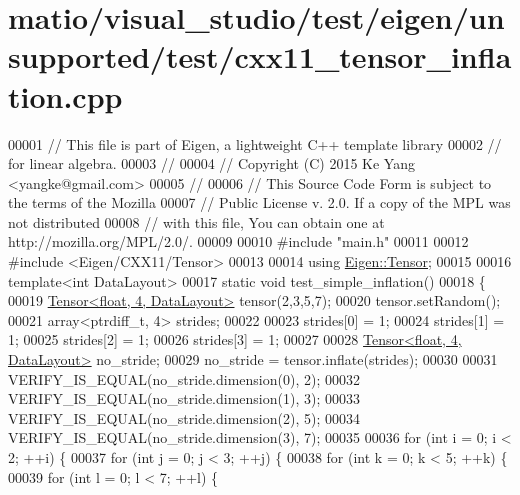 \hypertarget{matio_2visual__studio_2test_2eigen_2unsupported_2test_2cxx11__tensor__inflation_8cpp_source}{}\section{matio/visual\+\_\+studio/test/eigen/unsupported/test/cxx11\+\_\+tensor\+\_\+inflation.cpp}
\label{matio_2visual__studio_2test_2eigen_2unsupported_2test_2cxx11__tensor__inflation_8cpp_source}

\begin{DoxyCode}
00001 \textcolor{comment}{// This file is part of Eigen, a lightweight C++ template library}
00002 \textcolor{comment}{// for linear algebra.}
00003 \textcolor{comment}{//}
00004 \textcolor{comment}{// Copyright (C) 2015 Ke Yang <yangke@gmail.com>}
00005 \textcolor{comment}{//}
00006 \textcolor{comment}{// This Source Code Form is subject to the terms of the Mozilla}
00007 \textcolor{comment}{// Public License v. 2.0. If a copy of the MPL was not distributed}
00008 \textcolor{comment}{// with this file, You can obtain one at http://mozilla.org/MPL/2.0/.}
00009 
00010 \textcolor{preprocessor}{#include "main.h"}
00011 
00012 \textcolor{preprocessor}{#include <Eigen/CXX11/Tensor>}
00013 
00014 \textcolor{keyword}{using} \hyperlink{class_eigen_1_1_tensor}{Eigen::Tensor};
00015 
00016 \textcolor{keyword}{template}<\textcolor{keywordtype}{int} DataLayout>
00017 \textcolor{keyword}{static} \textcolor{keywordtype}{void} test\_simple\_inflation()
00018 \{
00019   \hyperlink{class_eigen_1_1_tensor}{Tensor<float, 4, DataLayout>} tensor(2,3,5,7);
00020   tensor.setRandom();
00021   array<ptrdiff\_t, 4> strides;
00022 
00023   strides[0] = 1;
00024   strides[1] = 1;
00025   strides[2] = 1;
00026   strides[3] = 1;
00027 
00028   \hyperlink{class_eigen_1_1_tensor}{Tensor<float, 4, DataLayout>} no\_stride;
00029   no\_stride = tensor.inflate(strides);
00030 
00031   VERIFY\_IS\_EQUAL(no\_stride.dimension(0), 2);
00032   VERIFY\_IS\_EQUAL(no\_stride.dimension(1), 3);
00033   VERIFY\_IS\_EQUAL(no\_stride.dimension(2), 5);
00034   VERIFY\_IS\_EQUAL(no\_stride.dimension(3), 7);
00035 
00036   \textcolor{keywordflow}{for} (\textcolor{keywordtype}{int} i = 0; i < 2; ++i) \{
00037     \textcolor{keywordflow}{for} (\textcolor{keywordtype}{int} j = 0; j < 3; ++j) \{
00038       \textcolor{keywordflow}{for} (\textcolor{keywordtype}{int} k = 0; k < 5; ++k) \{
00039         \textcolor{keywordflow}{for} (\textcolor{keywordtype}{int} l = 0; l < 7; ++l) \{

\end{DoxyCode}
